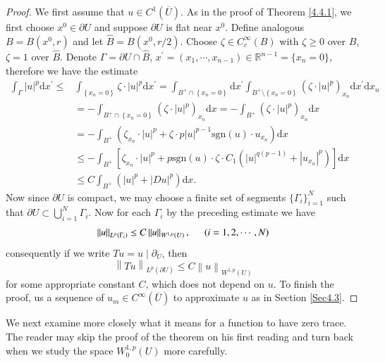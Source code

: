 \begin{proof}
We first assume that $u\in C^1(\overline{U})$. As in the proof of Theorem \ref{4.4.1}, we first choose $x^0\in\partial U$ and suppose $\partial U$ is flat near $x^0$. Define analogous $B=B(x^0,r)$ and let $\widehat{B}=B(x^0,r/2)$. Choose $\zeta\in C_c^\infty(B)$ with $\zeta\ge 0$ over $B$, $\zeta=1$ over $\widehat{B}$. Denote $\Gamma=\partial U\cap\widehat{B}$, $x^\prime=(x_1,\cdots,x_{n-1})\in\mathbb{R}^{n-1}=\{x_n=0\}$, therefore we have the estimate 
$$
\begin{aligned}
\int_{\Gamma}{\left| u \right|^p\mathrm{d}x^{\prime}}\le &\int_{\left\{ x_n=0 \right\}}{\zeta \cdot \left| u \right|^p\mathrm{d}x^{\prime}}=\int_{B^+\cap \left\{ x_n=0 \right\}}{\mathrm{d}x^{\prime}\int_{B^+\setminus \left\{ x_n=0 \right\}}{\left( \zeta \cdot \left| u \right|^p \right) _{x_n}\mathrm{d}x^{\prime}\mathrm{d}x_n}}
\\
&=-\int_{B^+\cap \left\{ x_n=0 \right\}}{\left( \zeta \cdot \left| u \right|^p \right) _{x_n}\mathrm{d}x}=-\int_{B^+}{\left( \zeta \cdot \left| u \right|^p \right) _{x_n}\mathrm{d}x}
\\
&=-\int_{B^+}{\left( \zeta _{x_n}\cdot \left| u \right|^p+\zeta \cdot p\left| u \right|^{p-1}\mathrm{sgn} \left( u \right) \cdot u_{x_n} \right) \mathrm{d}x}
\\
&\le -\int_{B^+}{\left[ \zeta _{x_n}\cdot \left| u \right|^p+p\mathrm{sgn} \left( u \right) \cdot \zeta \cdot C_1\left( \left| u \right|^{q\left( p-1 \right)}+\left| u_{x_n} \right|^p \right) \right] \mathrm{d}x}
\\
&\le C\int_{B^+}{\left( \left| u \right|^p+\left| Du \right|^p \right) \mathrm{d}x}.
\end{aligned}
$$
Now since $\partial U$ is compact, we may choose a finite set of segments $\{\Gamma_i\}_{i=1}^N$ such that $\partial U\subset\bigcup_{i=1}^N\Gamma_i$. Now for each $\Gamma_i$ by the preceding estimate we have 
$$
\left\| u \right\| _{L^p\left( \Gamma _i \right)}\le C\left\| u \right\| _{W^{1,p}\left( U \right)},\hspace{0.5cm}\left( i=1,2,\cdots ,N \right) 
$$
consequently if we write $Tu=u\mid\partial_U$, then 
$$
\left\| Tu \right\| _{L^p\left( \partial U \right)}\le C\left\| u \right\| _{W^{1,p}\left( U \right)}
$$
for some appropriate constant $C$, which does not depend on $u$. To finish the proof, us a sequence of $u_m\in C^\infty(\overline{U})$ to approximate $u$ as in Section \ref{Sec4.3}.
\end{proof}
We next examine more closely what it means for a function to have zero trace. The reader may skip the proof of the theorem on his first reading and turn back when we study the space $W_0^{1,p}(U)$ more carefully.
